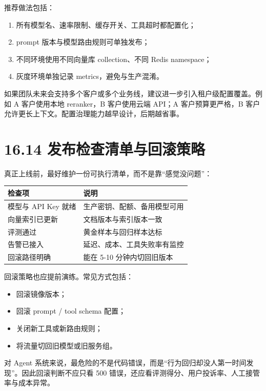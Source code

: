 推荐做法包括：


\begin{enumerate}[leftmargin=2em]
\item 所有模型名、速率限制、缓存开关、工具超时都配置化；
\item prompt 版本与模型路由规则可单独发布；
\item 不同环境使用不同向量库 collection、不同 Redis namespace；
\item 灰度环境单独记录 metrics，避免与生产混淆。
\end{enumerate}

如果团队未来会支持多个客户或多个业务线，建议进一步引入租户级配置覆盖。例如 A 客户使用本地 reranker，B 客户使用云端 API；A 客户预算更严格，B 客户允许更长上下文。配置治理能力越早设计，后期越省事。


\section{16.14 发布检查清单与回滚策略}

真正上线前，最好维护一份可执行清单，而不是靠``感觉没问题''：


\begingroup
\scriptsize
\setlength{\tabcolsep}{3pt}
\begin{longtable}{|p{}|p{}|}
\hline
检查项 & 说明 \\ \hline
模型与 API Key 就绪 & 生产密钥、配额、备用模型可用 \\ \hline
向量索引已更新 & 文档版本与索引版本一致 \\ \hline
评测通过 & 黄金样本与回归样本达标 \\ \hline
告警已接入 & 延迟、成本、工具失败率有监控 \\ \hline
回滚路径明确 & 能在 5-10 分钟内切回旧版本 \\ \hline
\end{longtable}
\endgroup

回滚策略也应提前演练。常见方式包括：


\begin{itemize}[leftmargin=2em]
\item 回滚镜像版本；
\item 回滚 prompt / tool schema 配置；
\item 关闭新工具或新路由规则；
\item 将流量切回旧模型或旧服务组。
\end{itemize}

对 Agent 系统来说，最危险的不是代码错误，而是``行为回归却没人第一时间发现''。因此回滚判断不应只看 500 错误，还应看评测得分、用户投诉率、人工接管率与成本异常。



